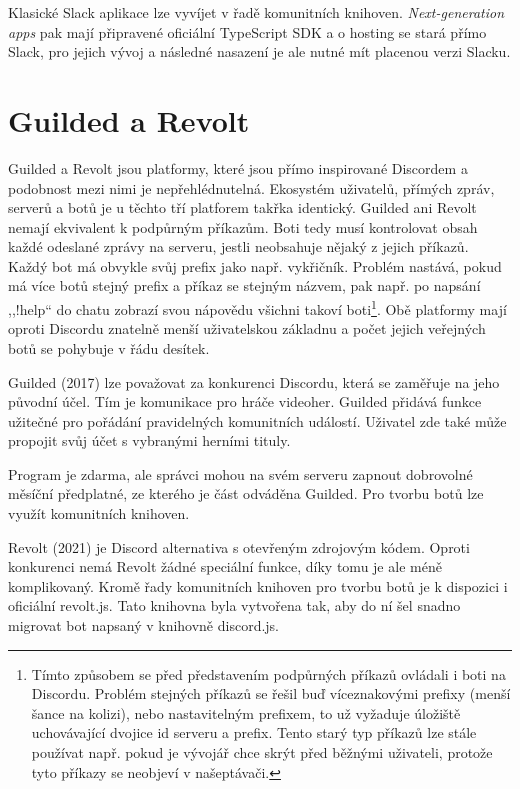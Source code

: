 \documentclass[FM]{tulthesis}
\begin{document}
	Klasické Slack aplikace lze vyvíjet v řadě komunitních knihoven. \textit{Next-generation apps} pak mají připravené oficiální \mbox{TypeScript} SDK a o hosting se stará přímo Slack, pro jejich vývoj a následné nasazení je ale nutné mít placenou verzi Slacku.
	
	\section{Guilded a Revolt}
	
	Guilded a Revolt jsou platformy, které jsou přímo inspirované Discordem a podobnost mezi nimi je nepřehlédnutelná. Ekosystém uživatelů, přímých zpráv, serverů a botů je u těchto tří platforem takřka identický. Guilded ani Revolt nemají ekvivalent k podpůrným příkazům. Boti tedy musí kontrolovat obsah každé odeslané zprávy na serveru, jestli neobsahuje nějaký z jejich příkazů. Každý bot má obvykle svůj prefix jako např. vykřičník. Problém nastává, pokud má více botů stejný prefix a příkaz se stejným názvem, pak např. po napsání ,,!help`` do chatu zobrazí svou nápovědu všichni takoví boti\footnote{Tímto způsobem se před představením podpůrných příkazů ovládali i boti na Discordu. Problém stejných příkazů se řešil buď víceznakovými prefixy (menší šance na kolizi), nebo nastavitelným prefixem, to už vyžaduje úložiště uchovávající dvojice id serveru a prefix. Tento starý typ příkazů lze stále používat např. pokud je vývojář chce skrýt před běžnými uživateli, protože tyto příkazy se neobjeví v našeptávači.}. Obě platformy mají oproti Discordu znatelně menší uživatelskou základnu a počet jejich veřejných botů se pohybuje v řádu desítek.
	
	Guilded (2017) lze považovat za konkurenci Discordu, která se zaměřuje na jeho původní účel. Tím je komunikace pro hráče videoher. Guilded přidává funkce užitečné pro pořádání pravidelných komunitních událostí. Uživatel zde také může propojit svůj účet s vybranými herními tituly. \cite{web_guilded} 
	
	Program je zdarma, ale správci mohou na svém serveru zapnout dobrovolné měsíční předplatné, ze kterého je část odváděna Guilded. Pro tvorbu botů lze využít komunitních knihoven.
	
	Revolt (2021) je Discord alternativa s otevřeným zdrojovým kódem. Oproti konkurenci nemá Revolt žádné speciální funkce, díky tomu je ale méně komplikovaný. Kromě řady komunitních knihoven pro tvorbu botů je k dispozici i oficiální revolt.js. Tato knihovna byla vytvořena tak, aby do ní šel snadno migrovat bot napsaný v knihovně discord.js.
	
\end{document}
